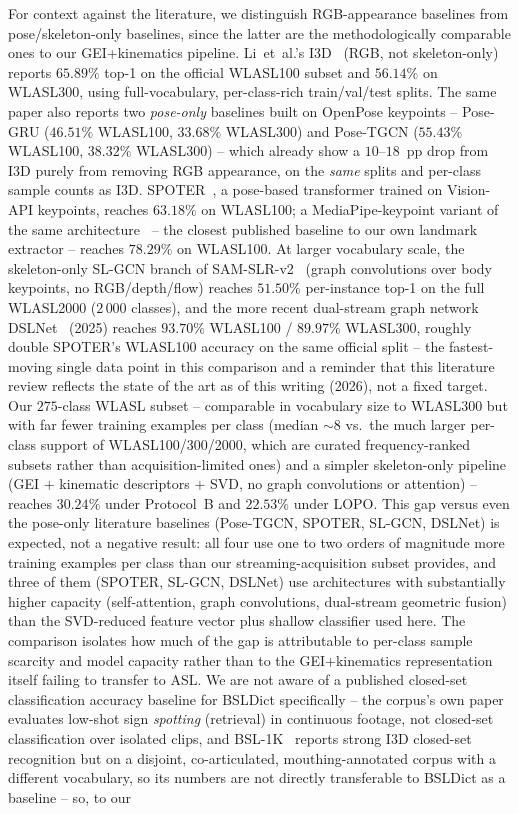 \documentclass[journal]{IEEEtran}
\begin{document}
For context against the literature, we distinguish RGB-appearance baselines from pose/skeleton-only baselines, since the latter are the methodologically comparable ones to our GEI+kinematics pipeline. Li~et~al.'s I3D~\cite{wlasl2020} (RGB, not skeleton-only) reports $65.89\%$ top-1 on the official WLASL100 subset and $56.14\%$ on WLASL300, using full-vocabulary, per-class-rich train/val/test splits. The same paper also reports two \emph{pose-only} baselines built on OpenPose keypoints -- Pose-GRU ($46.51\%$ WLASL100, $33.68\%$ WLASL300) and Pose-TGCN ($55.43\%$ WLASL100, $38.32\%$ WLASL300) -- which already show a $10$--$18$~pp drop from I3D purely from removing RGB appearance, on the \emph{same} splits and per-class sample counts as I3D. SPOTER~\cite{bohacek2022spoter}, a pose-based transformer trained on Vision-API keypoints, reaches $63.18\%$ on WLASL100; a MediaPipe-keypoint variant of the same architecture~\cite{bohacek2022mediapipe} -- the closest published baseline to our own landmark extractor -- reaches $78.29\%$ on WLASL100. At larger vocabulary scale, the skeleton-only SL-GCN branch of SAM-SLR-v2~\cite{jiang2021samslr} (graph convolutions over body keypoints, no RGB/depth/flow) reaches $51.50\%$ per-instance top-1 on the full WLASL2000 ($2\,000$ classes), and the more recent dual-stream graph network DSLNet~\cite{liu2025dslnet} (2025) reaches $93.70\%$ WLASL100 / $89.97\%$ WLASL300, roughly double SPOTER's WLASL100 accuracy on the same official split -- the fastest-moving single data point in this comparison and a reminder that this literature review reflects the state of the art as of this writing (2026), not a fixed target. Our $275$-class WLASL subset -- comparable in vocabulary size to WLASL300 but with far fewer training examples per class (median $\sim$$8$ vs.\ the much larger per-class support of WLASL100/300/2000, which are curated frequency-ranked subsets rather than acquisition-limited ones) and a simpler skeleton-only pipeline (GEI + kinematic descriptors + SVD, no graph convolutions or attention) -- reaches $30.24\%$ under Protocol~B and $22.53\%$ under LOPO. This gap versus even the pose-only literature baselines (Pose-TGCN, SPOTER, SL-GCN, DSLNet) is expected, not a negative result: all four use one to two orders of magnitude more training examples per class than our streaming-acquisition subset provides, and three of them (SPOTER, SL-GCN, DSLNet) use architectures with substantially higher capacity (self-attention, graph convolutions, dual-stream geometric fusion) than the SVD-reduced feature vector plus shallow classifier used here. The comparison isolates how much of the gap is attributable to per-class sample scarcity and model capacity rather than to the GEI+kinematics representation itself failing to transfer to ASL. We are not aware of a published closed-set classification accuracy baseline for BSLDict specifically -- the corpus's own paper~\cite{momeni2020bsldict} evaluates low-shot sign \emph{spotting} (retrieval) in continuous footage, not closed-set classification over isolated clips, and BSL-1K~\cite{albanie2020bsl1k} reports strong I3D closed-set recognition but on a disjoint, co-articulated, mouthing-annotated corpus with a different vocabulary, so its numbers are not directly transferable to BSLDict as a baseline -- so, to our 
\end{document}
